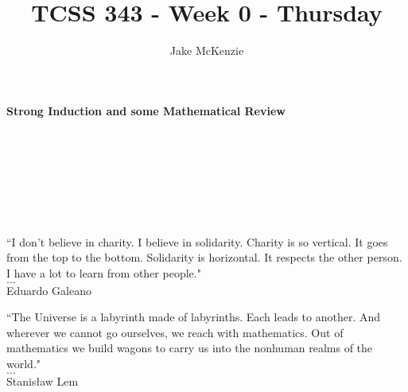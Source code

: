 \documentclass[12pt]{article}
\begin{document}
\title{TCSS 343 - Week 0 - Thursday}
\author{Jake McKenzie}
\maketitle
\noindent\centerline{\textbf{Strong Induction and some Mathematical Review}}\\\\\\\\\\\\
\begin{center}
    ``I don't believe in charity. I believe in solidarity. Charity is so vertical. It goes from the top to the bottom. Solidarity is horizontal. It respects the other person. I have a lot to learn from other people." \\$\dots$\\ Eduardo Galeano
\end{center}
\begin{center}
    ``The Universe is a labyrinth made of labyrinths. Each leads to another. And wherever we cannot go ourselves, we reach with mathematics. Out of mathematics we build wagons to carry us into the nonhuman realms of the world." \\$\dots$\\ Stanisław Lem
\end{center}
\newpage
\end{document}
